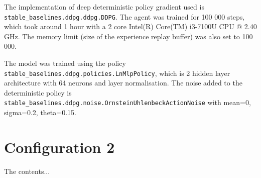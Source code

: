 \documentclass[class=book, crop=false]{standalone}
\begin{document}
The implementation of deep deterministic policy gradient used is \texttt{stable\_baselines.ddpg.ddpg.DDPG}. The agent was trained for 100 000 steps, which took around 1 hour with a 2 core Intel(R) Core(TM) i3-7100U CPU @ 2.40 GHz. The memory limit (size of the experience replay buffer) was also set to 100 000. 

The model was trained using the policy \texttt{stable\_baselines.ddpg.policies.LnMlpPolicy}, which is 2 hidden layer architecture with 64 neurons and layer normalisation. The noise added to the deterministic policy is \texttt{stable\_baselines.ddpg.noise.OrnsteinUhlenbeckActionNoise} with mean=0, sigma=0.2, theta=0.15.  


\section{Configuration 2}
The contents...
\end{document}
